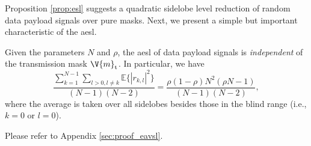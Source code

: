 \documentclass[journal,a4paper,10pt, romanappendices]{IEEEtran}
\begin{document}
Proposition \ref{prop:esl} suggests a quadratic sidelobe level reduction of random data payload signals over pure masks. Next, we present a simple but important characteristic of the \ac{aesl}.
\begin{proposition}\label{prop:eavsl}
Given the parameters $N$ and $\rho$, the \ac{aesl} of data payload signals is \emph{independent} of the transmission mask $\V{m}_{\rm t}$. In particular, we have
\begin{equation}\label{eavsl}
\frac{\sum_{k=1}^{N-1}\sum_{l>0,l\neq k} \mathbb{E}\{|r_{k,l}|^2\}}{(N-1)(N-2)}  = \frac{\rho(1-\rho)N^2(\rho N-1)}{(N-1)(N-2)},
\end{equation}
where the average is taken over all sidelobes besides those in the blind range (i.e., $k=0$ or $l=0$).
\begin{IEEEproof}
Please refer to Appendix \ref{sec:proof_eavsl}.
\end{IEEEproof}
\end{proposition}
\end{document}
